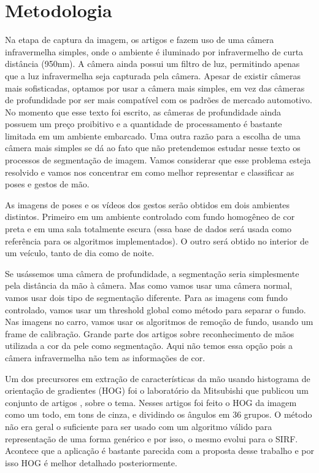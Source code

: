 \section{Metodologia}

Na etapa de captura da imagem, os artigos \cite{ref2} e \cite{ref1} fazem uso de uma câmera infravermelha simples, onde o ambiente é iluminado por infravermelho de curta distância (950nm). A câmera ainda possui um filtro de luz, permitindo apenas que a luz infravermelha seja capturada pela câmera. Apesar de existir câmeras mais sofisticadas, optamos por usar a câmera mais simples, em vez das câmeras de profundidade por ser mais compatível com os padrões de mercado automotivo. No momento que esse texto foi escrito, as câmeras de profundidade ainda possuem um preço proibitivo e a quantidade de processamento é bastante limitada em um ambiente embarcado. Uma outra razão para a escolha de uma câmera mais simples se dá ao fato que não pretendemos estudar nesse texto os processos de segmentação de imagem. Vamos considerar que esse problema esteja resolvido e vamos nos concentrar em como melhor representar e classificar as poses e gestos de mão.

As imagens de poses e os vídeos dos gestos serão obtidos em  dois ambientes distintos. Primeiro em um ambiente controlado com fundo homogêneo de cor preta e em uma sala totalmente escura (essa base de dados será usada como referência para os algoritmos implementados). O outro será obtido no interior de um veículo, tanto de dia como de noite.

Se usássemos uma câmera de profundidade, a segmentação seria simplesmente pela distância da mão à câmera. Mas como vamos usar uma câmera normal, vamos usar dois tipo de segmentação diferente. 
Para as imagens com fundo controlado, vamos usar um threshold global como método para separar o fundo. Nas imagens no carro, vamos usar os algoritmos de remoção de fundo, usando um frame de calibração.
Grande parte dos artigos sobre reconhecimento de mãos utilizada a cor da pele como segmentação. Aqui não temos essa opção pois a câmera infravermelha não tem as informações de cor.

Um dos precursores em extração de características da mão usando histograma de orientação de gradientes (HOG) foi o laboratório da Mitsubishi que publicou um conjunto de artigos \cite{ref3}, \cite{ref4} sobre o tema. Nesses artigos foi feito o HOG da imagem como um todo, em tons de cinza, e dividindo os ângulos em 36 grupos. O método não era geral o suficiente para ser usado com um algoritmo válido para representação de uma forma genérico e por isso, o mesmo evolui para o SIRF. Acontece que a aplicação é bastante parecida com a proposta desse trabalho e por isso HOG é melhor detalhado posteriormente.

